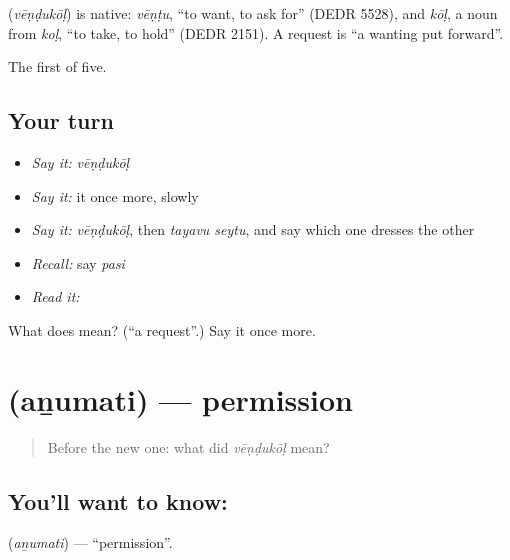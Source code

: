 \begin{cousinweb}
\textbf{} (\emph{vēṇḍukōḷ}) is native: \emph{vēṇṭu}, \textquotedblleft{}to want, to ask for\textquotedblright{} (DEDR 5528), and \emph{kōḷ}, a noun from \emph{koḷ}, \textquotedblleft{}to take, to hold\textquotedblright{} (DEDR 2151). A request is \textquotedblleft{}a wanting put forward\textquotedblright{}.
\end{cousinweb}

\begin{grammarlens}[title={What you've built}]
The first of five.
\end{grammarlens}

\subsection*{Your turn}
\begin{itemize}
\raggedright
  \item \emph{Say it:} \emph{vēṇḍukōḷ}
  \item \emph{Say it:} it once more, slowly
  \item \emph{Say it:} \emph{vēṇḍukōḷ}, then \emph{tayavu seytu}, and say which one dresses the other
  \item \emph{Recall:} say \emph{pasi}
  \item \emph{Read it:} \textbf{}
\end{itemize}

\begin{tcolorbox}[breakable,colback=teal!4,colframe=teal!35!black,title={Before you move on}]
What does  mean? (\textquotedblleft{}a request\textquotedblright{}.) Say it once more.
\end{tcolorbox}
\section[\texorpdfstring{\ta{அனுமதி} (aṉumati)}{அனுமதி (aṉumati)}]{ (aṉumati) — permission}

\label{lesson:TA-C63-permission}



\begin{quote}
Before the new one: what did \emph{vēṇḍukōḷ} mean?
\end{quote}

\subsection*{You'll want to know: }
\textbf{} (\emph{aṉumati}) — \textquotedblleft{}permission\textquotedblright{}.

